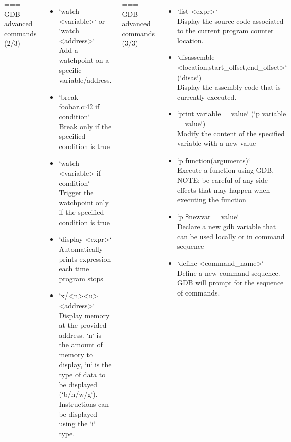 \begin{columns}[T]
{=== GDB advanced commands (2/3)
  \small
  \begin{itemize}
    \item `watch <variable>` or `watch \*<address>`\\
      Add a watchpoint on a specific variable/address.
    \item `break foobar.c:42 if condition`\\
      Break only if the specified condition is true
    \item `watch <variable> if condition`\\
      Trigger the watchpoint only if the specified condition is true
    \item `display <expr>`\\
      Automatically prints expression each time program stops
    \item `x/<n><u> <address>`\\
      Display memory at the provided address. `n` is the amount of memory to
      display, `u` is the type of data to be displayed (`b/h/w/g`).
      Instructions can be displayed using the `i` type.
  \end{itemize}


=== GDB advanced commands (3/3)
  \small
  \begin{itemize}
    \item `list <expr>`\\
      Display the source code associated to the current program counter location.
    \item `disassemble <location,start_offset,end_offset>` (`disas`)\\
      Display the assembly code that is currently executed.
    \item `print variable = value` (`p variable = value`)\\
      Modify the content of the specified variable with a new value
    \item `p function(arguments)`\\
      Execute a function using GDB. NOTE: be careful of any side effects that
      may happen when executing the function
    \item `p \$newvar = value`\\
      Declare a new gdb variable that can be used locally or in command sequence
    \item `define <command_name>`\\
      Define a new command sequence. GDB will prompt for the sequence of
      commands.
  \end{itemize}

}
\end{columns}
